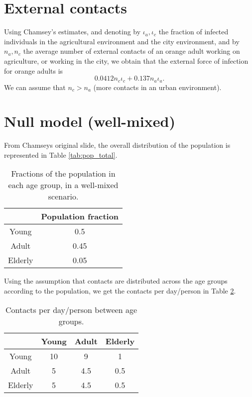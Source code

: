 \documentclass{article}
\begin{document}
\section{External contacts}
Using Chamsey's estimates, and denoting by $\iota_a,\iota_c$ the fraction of
infected individuals in the agricultural environment and the city environment,
and by $n_a,n_c$ the average number of external contacts of an orange adult working on
agriculture, or working in the city, we obtain that the external force of
infection for orange adults is
\[
0.0412 n_c \iota_c + 0.137 n_a \iota_a.
\]
We can assume that $n_c > n_a$ (more contacts in an urban environment).

\section{Null model (well-mixed)}

From Chamseys original slide, the overall distribution of the population is
represented in Table \ref{tab:pop_total}.

\begin{table}[h!]
\begin{center}
\begin{tabular}{ |c|c| } 
 \hline
          & Population fraction\\ 
\hline
Young     & 0.5 \\ 
\hline
Adult     & 0.45 \\ 
\hline
Elderly   & 0.05 \\ 
\hline
\end{tabular}
\caption{Fractions of the population in each age group, in a well-mixed
scenario.}
\label{tab:pop_distro}
\end{center}
\end{table}

Using the assumption that contacts are distributed across the age groups
according to the population, we get the contacts per day/person in Table
\ref{tab:contact_wellmixed}.

\begin{table}[h!]
\begin{center}
\begin{tabular}{ |c|c|c|c| } 
 \hline
          & Young & Adult & Elderly \\ 
\hline
Young     & 10    & 9     & 1       \\ 
\hline
Adult     &  5    & 4.5   & 0.5     \\ 
\hline
Elderly   &  5    & 4.5   & 0.5      \\ 
\hline
\end{tabular}
\caption{Contacts per day/person between age groups.}
\label{tab:contact_wellmixed}
\end{center}
\end{table}
\end{document}
